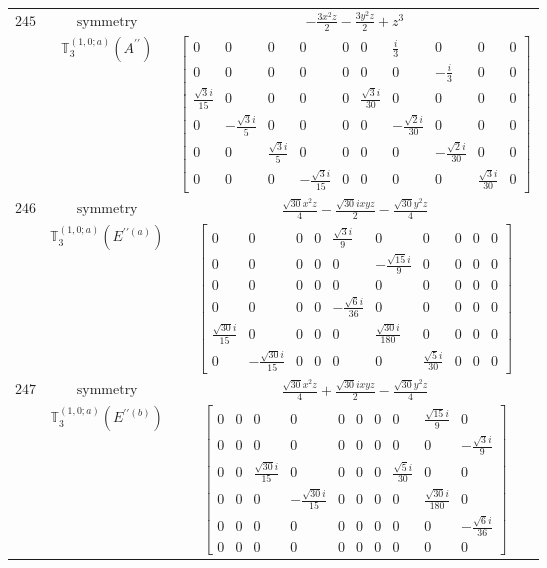 \documentclass[fleqn,8pt,landscape]{jsarticle}
\begin{document}
\begin{longtable}{ccc}
$ 245 $ & $ \text{symmetry} $ & $ - \frac{3 x^{2} z}{2} - \frac{3 y^{2} z}{2} + z^{3} $ \\
$  $ & $ \mathbb{T}_{3}^{(1,0;a)}(A^{\prime\prime}) $ & $ \begin{bmatrix} 0 & 0 & 0 & 0 & 0 & 0 & \frac{i}{3} & 0 & 0 & 0 \\ 0 & 0 & 0 & 0 & 0 & 0 & 0 & - \frac{i}{3} & 0 & 0 \\ \frac{\sqrt{3} i}{15} & 0 & 0 & 0 & 0 & \frac{\sqrt{3} i}{30} & 0 & 0 & 0 & 0 \\ 0 & - \frac{\sqrt{3} i}{5} & 0 & 0 & 0 & 0 & - \frac{\sqrt{2} i}{30} & 0 & 0 & 0 \\ 0 & 0 & \frac{\sqrt{3} i}{5} & 0 & 0 & 0 & 0 & - \frac{\sqrt{2} i}{30} & 0 & 0 \\ 0 & 0 & 0 & - \frac{\sqrt{3} i}{15} & 0 & 0 & 0 & 0 & \frac{\sqrt{3} i}{30} & 0 \end{bmatrix} $ \\ \hline
$ 246 $ & $ \text{symmetry} $ & $ \frac{\sqrt{30} x^{2} z}{4} - \frac{\sqrt{30} i x y z}{2} - \frac{\sqrt{30} y^{2} z}{4} $ \\
$  $ & $ \mathbb{T}_{3}^{(1,0;a)}(E^{\prime\prime(a)}) $ & $ \begin{bmatrix} 0 & 0 & 0 & 0 & \frac{\sqrt{3} i}{9} & 0 & 0 & 0 & 0 & 0 \\ 0 & 0 & 0 & 0 & 0 & - \frac{\sqrt{15} i}{9} & 0 & 0 & 0 & 0 \\ 0 & 0 & 0 & 0 & 0 & 0 & 0 & 0 & 0 & 0 \\ 0 & 0 & 0 & 0 & - \frac{\sqrt{6} i}{36} & 0 & 0 & 0 & 0 & 0 \\ \frac{\sqrt{30} i}{15} & 0 & 0 & 0 & 0 & \frac{\sqrt{30} i}{180} & 0 & 0 & 0 & 0 \\ 0 & - \frac{\sqrt{30} i}{15} & 0 & 0 & 0 & 0 & \frac{\sqrt{5} i}{30} & 0 & 0 & 0 \end{bmatrix} $ \\ \hline
$ 247 $ & $ \text{symmetry} $ & $ \frac{\sqrt{30} x^{2} z}{4} + \frac{\sqrt{30} i x y z}{2} - \frac{\sqrt{30} y^{2} z}{4} $ \\
$  $ & $ \mathbb{T}_{3}^{(1,0;a)}(E^{\prime\prime(b)}) $ & $ \begin{bmatrix} 0 & 0 & 0 & 0 & 0 & 0 & 0 & 0 & \frac{\sqrt{15} i}{9} & 0 \\ 0 & 0 & 0 & 0 & 0 & 0 & 0 & 0 & 0 & - \frac{\sqrt{3} i}{9} \\ 0 & 0 & \frac{\sqrt{30} i}{15} & 0 & 0 & 0 & 0 & \frac{\sqrt{5} i}{30} & 0 & 0 \\ 0 & 0 & 0 & - \frac{\sqrt{30} i}{15} & 0 & 0 & 0 & 0 & \frac{\sqrt{30} i}{180} & 0 \\ 0 & 0 & 0 & 0 & 0 & 0 & 0 & 0 & 0 & - \frac{\sqrt{6} i}{36} \\ 0 & 0 & 0 & 0 & 0 & 0 & 0 & 0 & 0 & 0 \end{bmatrix} $ \\ \hline

\end{longtable}
\end{document}

